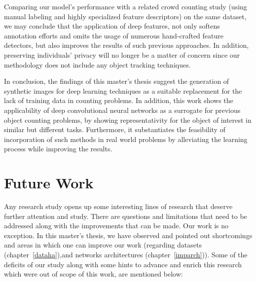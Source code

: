 Comparing our model's performance with a related crowd counting study (using manual labeling and highly specialized feature descriptors) on the same dataset, we may conclude that the application of deep features, not only softens annotation efforts and omits the usage of numerous hand-crafted feature detectors, but also improves the results of such previous approaches. In addition, preserving individuals' privacy will no longer be a matter of concern since our methodology does not include any object tracking techniques.    

\noindent In conclusion, the findings of this master's thesis suggest the generation of synthetic images for deep learning techniques as a suitable replacement for the lack of training data in counting problems. In addition, this work shows the applicability of deep convolutional neural networks as a surrogate for previous object counting problems, by showing representativity for the object of interest in similar but different tasks. Furthermore, it substantiates the feasibility of incorporation of such methods in real world problems by alleviating the learning process while improving the results.  


\section{Future Work}

Any research study opens up some interesting lines of research that deserve further attention and study. There are questions and limitations that need to be addressed along with the improvements that can be made. Our work is no exception. In this master's thesis, we have observed and pointed out shortcomings and areas in which one can improve our work (regarding datasets (chapter~\ref{dataha}),and networks architectures (chapter~\ref{imparch})). Some of the deficits of our study along with some hints to advance and enrich this research which were out of scope of this work, are mentioned below:

